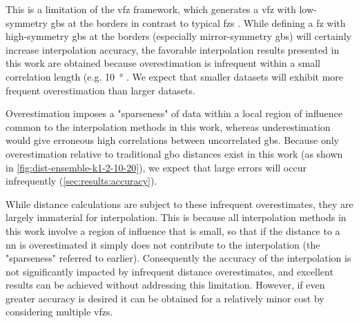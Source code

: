 \documentclass[final,twocolumn,12pt]{elsarticle}
\begin{document}
This is a limitation of the \gls{vfz} framework, which generates a \gls{vfz} with low-symmetry \glspl{gb} at the borders in contrast to typical \glspl{fz} \cite{patalaSymmetriesRepresentationGrain2013,homerGrainBoundaryPlane2015}. While defining a \gls{fz} with high-symmetry \glspl{gb} at the borders (especially mirror-symmetry \glspl{gb}) will certainly increase interpolation accuracy, the favorable interpolation results presented in this work are obtained because overestimation is infrequent within a small correlation length (e.g. \SI{10}{\degree} \cite{olmstedSurveyComputedGrain2009}. %
We expect that smaller datasets will exhibit more frequent overestimation than larger datasets.

Overestimation imposes a "sparseness" of data within a local region of influence common to the interpolation methods in this work, whereas underestimation would give erroneous high correlations between uncorrelated \glspl{gb}. Because only overestimation relative to traditional \gls{gbo} distances exist in this work (as shown in \cref{fig:dist-ensemble-k1-2-10-20}), we expect that large errors will occur infrequently (\cref{sec:results:accuracy}). 

While distance calculations are subject to these infrequent overestimates, they are largely immaterial for interpolation. This is because all interpolation methods in this work involve a region of influence that is small, so that if the distance to a \gls{nn} is overestimated it simply does not contribute to the interpolation (the "sparseness" referred to earlier). Consequently the accuracy of the interpolation is not significantly impacted by infrequent distance overestimates, and excellent results can be achieved without addressing this limitation. However, if even greater accuracy is desired it can be obtained for a relatively minor cost by considering multiple \glspl{vfz}.
\end{document}
